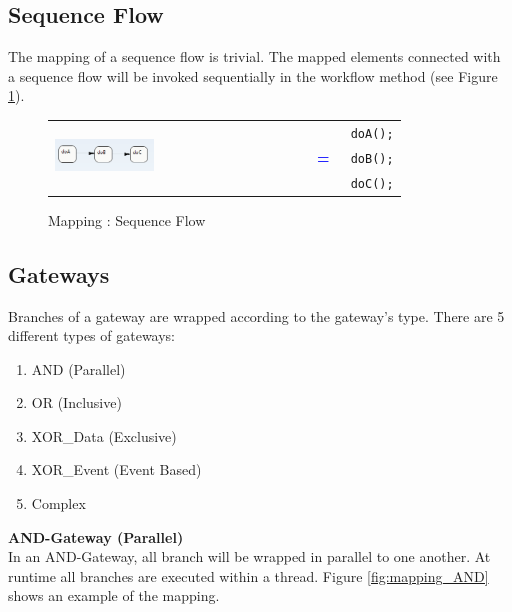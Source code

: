 \subsection{Sequence Flow}
The mapping of a sequence flow is trivial. The mapped elements connected with a sequence flow will be invoked sequentially in the workflow method (see Figure \ref{fig:mapping_sequence}).\\

\begin{figure}[h]
	\begin{tabularx}{\linewidth}{lcX}
		\multirow{3}{*}{\includegraphics[width=0.4\textwidth]{images/mapping/sequence.png}} &  &	\texttt{	doA();}\\
		& \textbf{\textcolor{blue}{=}}& \texttt{	doB();}\\
		& & \texttt{	doC();}\\
	\end{tabularx}
\caption{Mapping : Sequence Flow}%
\label{fig:mapping_sequence}%
\end{figure}

\subsection{Gateways}
Branches of a gateway are wrapped according to the gateway's type. There are 5 different types of gateways:
\begin{enumerate}
	\item AND (Parallel)
	\item OR (Inclusive)
	\item XOR\_Data (Exclusive)
	\item XOR\_Event (Event Based)
	\item Complex 
\end{enumerate}

\textbf{AND-Gateway (Parallel)}\\
In an AND-Gateway, all branch will be wrapped in parallel to one another. At runtime all branches are executed within a thread. 
Figure \ref{fig:mapping_AND} shows an example of the mapping. \\

